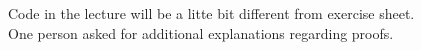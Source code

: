 \begin{frame}{\LectureFeedbackLectureTitle}
  Code in the lecture will be a litte bit different
  from exercise sheet.\\
  \vspace{1.0em}
  One person asked for additional explanations
  regarding proofs.
\end{frame}
